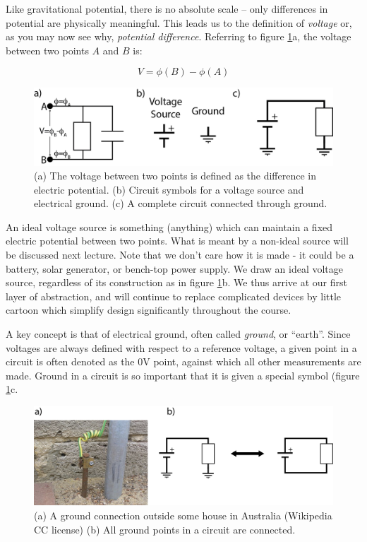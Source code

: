 \documentclass{tufte-book}
\begin{document}
Like gravitational potential, there is no absolute scale -- only differences in potential are physically meaningful. This leads us to the definition of \textit{voltage} or, as you may now see why, \textit{potential difference}. Referring to figure \ref{fig:volt_ref}a, the voltage between two points $A$ and $B$ is:

\begin{equation}
  \boxed{V = \phi(B)-\phi(A)}
\end{equation}

\begin{figure}
\caption{(a) The voltage between two points is defined as the difference in electric potential. (b) Circuit symbols for a voltage source and electrical ground. (c) A complete circuit connected through ground.}
\label{fig:volt_ref}
\begin{center}
\includegraphics[width=\textwidth]{volt_ref}
\end{center}
\end{figure}

An ideal voltage source is something (anything) which can maintain a fixed electric potential between two points. What is meant by a non-ideal source will be discussed next lecture. Note that we don't care how it is made - it could be a battery, solar generator, or bench-top power supply. We draw an ideal voltage source, regardless of its construction as in figure \ref{fig:volt_ref}b. We thus arrive at our first layer of abstraction, and will continue to replace complicated devices by little cartoon which simplify design significantly throughout the course.

A key concept is that of electrical ground, often called \textit{ground}, or ``earth''. Since voltages are always defined with respect to a reference voltage, a given point in a circuit is often denoted as the 0V point, against which all other measurements are made. Ground in a circuit is so important that it is given a special symbol (figure \ref{fig:volt_ref}c. 

\begin{figure}
\caption{(a) A ground connection outside some house in Australia (Wikipedia CC license) (b) All ground points in a circuit are connected.}
\label{fig:ground_ref}
\begin{center}
\includegraphics[width=\textwidth]{ground_and_pound}
\end{center}
\end{figure}
\end{document}
